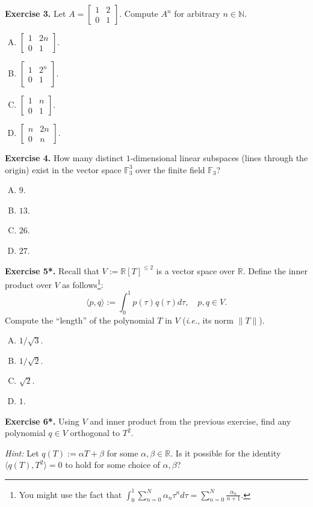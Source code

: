 \documentclass[../../book.tex]{subfiles}
\begin{document}
\textbf{Exercise 3.} Let $A=\begin{bmatrix}
    1 & 2 \\ 0 & 1
\end{bmatrix}$. Compute $A^n$ for arbitrary $n \in \mathbb{N}$.
\begin{enumerate}[(A)]
    \item $\begin{bmatrix} 1 & 2n \\ 0 & 1 \end{bmatrix}$.
    \item $\begin{bmatrix} 1 & 2^n \\ 0 & 1 \end{bmatrix}$.
    \item $\begin{bmatrix} 1 & n \\ 0 & 1 \end{bmatrix}$.
    \item $\begin{bmatrix} n & 2n \\ 0 & n \end{bmatrix}$.
\end{enumerate}

\textbf{Exercise 4.} How many distinct $1$-dimensional linear subspaces (lines through the origin) exist in the vector space $\mathbb{F}_3^3$ over the finite field $\mathbb{F}_3$?
\begin{enumerate}[(A)]
    \item $9$.
    \item $13$.
    \item $26$.
    \item $27$.
\end{enumerate}

\textbf{Exercise 5*.} Recall that $V := \mathbb{R}[T]^{\leq 2}$ is a vector space over $\mathbb{R}$.
Define the inner product over $V$ as follows\footnote{You might use the fact that $\int_0^1 \sum_{n=0}^N \alpha_n\tau^nd\tau = \sum_{n=0}^N \frac{\alpha_n}{n+1}$.}:
\begin{equation*}
    \langle p,q \rangle := \int_0^1 p(\tau)q(\tau)d\tau, \quad p,q \in V.
\end{equation*}
Compute the ``length'' of the polynomial $T$ in $V$ (\textit{i.e.}, its norm $\|T\|$).
\begin{enumerate}[(A)]
    \item $1/\sqrt{3}$.
    \item $1/\sqrt{2}$.
    \item $\sqrt{2}$.
    \item $1$.
\end{enumerate}

\textbf{Exercise 6*.} Using $V$ and inner product from the previous exercise, find any polynomial $q \in V$ orthogonal to $T^2$.

\textit{Hint:} Let $q(T) := \alpha T+\beta$ for some $\alpha,\beta \in \mathbb{R}$. Is it possible for the identity $\langle q(T), T^2 \rangle=0$ to hold for some choice of $\alpha,\beta$?
\end{document}
